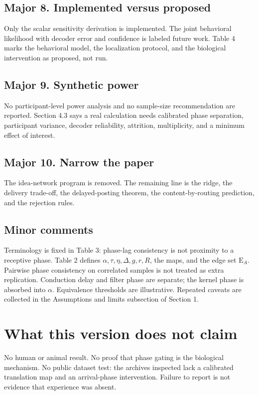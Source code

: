 \documentclass[11pt]{article}
\begin{document}
\subsection*{Major 8. Implemented versus proposed}
Only the scalar sensitivity derivation is implemented. The joint behavioral likelihood with decoder error and confidence is labeled future work. Table 4 marks the behavioral model, the localization protocol, and the biological intervention as proposed, not run.

\subsection*{Major 9. Synthetic power}
No participant-level power analysis and no sample-size recommendation are reported. Section 4.3 says a real calculation needs calibrated phase separation, participant variance, decoder reliability, attrition, multiplicity, and a minimum effect of interest.

\subsection*{Major 10. Narrow the paper}
The idea-network program is removed. The remaining line is the ridge, the delivery trade-off, the delayed-posting theorem, the content-by-routing prediction, and the rejection rules.

\subsection*{Minor comments}
Terminology is fixed in Table 3: phase-lag consistency is not proximity to a receptive phase. Table 2 defines \(\alpha,\tau,\eta,\Delta,g,r,R\), the maps, and the edge set \(\mathrm{E}_A\). Pairwise phase consistency on correlated samples is not treated as extra replication. Conduction delay and filter phase are separate; the kernel phase is absorbed into \(\alpha\). Equivalence thresholds are illustrative. Repeated caveats are collected in the Assumptions and limits subsection of Section 1.

\section*{What this version does not claim}
No human or animal result. No proof that phase gating is the biological mechanism. No public dataset test: the archives inspected lack a calibrated translation map and an arrival-phase intervention. Failure to report is not evidence that experience was absent.
\end{document}
